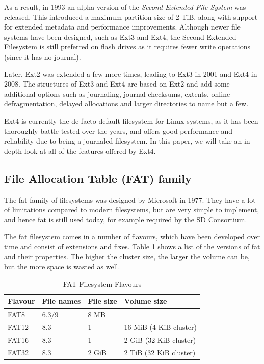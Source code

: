 \documentclass[a4paper]{article}
\begin{document}
As a result, in 1993 an alpha version of the \emph{Second Extended File System} was released. This introduced a maximum partition size of 2 TiB, along with support for extended metadata and performance improvements\cite{osdev:ext2,ext2-doc,ext2-impl}. Although newer file systems have been designed, such as Ext3 and Ext4, the Second Extended Filesystem is still preferred on flash drives as it requires fewer write operations (since it has no journal). 

Later, Ext2 was extended a few more times, leading to Ext3 in 2001 and Ext4 in 2008. The structures of Ext3 and Ext4 are based on Ext2 and add some additional options such as journaling, journal checksums, extents, online defragmentation, delayed allocations and larger directories to name but a few\cite{ext2-doc}.

Ext4 is currently the de-facto default filesystem for Linux systems, as it has been thoroughly battle-tested over the years, and offers good performance and reliability due to being a journaled filesystem. In this paper, we will take an in-depth look at all of the features offered by Ext4.

\subsection{File Allocation Table (FAT) family}

The \gls{fat} family of filesystems was designed by Microsoft in 1977. They have a lot of limitations compared to modern filesystems, but are very simple to implement, and hence \gls{fat} is still used today, for example required by the SD Consortium\cite{sd-assoc}.



The \gls{fat} filesystem comes in a number of flavours, which have been developed over time and consist of extensions and fixes. Table \ref{tbl:fatfs} shows a list of the versions of \gls{fat} and their properties. The higher the cluster size, the larger the volume can be, but the more space is wasted as well.

\begin{table}[!h]
\centering\caption{FAT Filesystem Flavours}\label{tbl:fatfs}
\begin{tabular}{@{}llll@{}}
\toprule
Flavour & File names & File size & Volume size\\
\midrule
FAT8 & 6.3/9 & 8 MB &\\
FAT12 & 8.3 & 1 & 16 MiB (4 KiB cluster)\\
FAT16 & 8.3 & 1 & 2 GiB (32 KiB cluster)\\
FAT32 & 8.3 & 2 GiB & 2 TiB (32 KiB cluster)\\
\bottomrule
\end{tabular}
\end{table}
\end{document}
